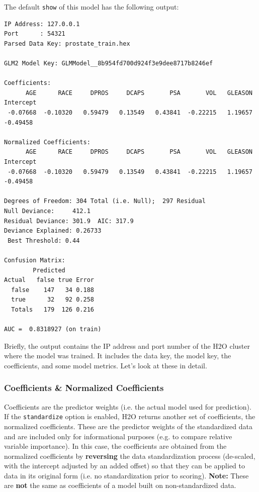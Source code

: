 The default \texttt{show} of this model has the following output:

\begin{lstlisting}[style=output]
IP Address: 127.0.0.1 
Port      : 54321 
Parsed Data Key: prostate_train.hex 

GLM2 Model Key: GLMModel__8b954fd700d924f3e9dee8717b8246ef

Coefficients:
      AGE      RACE     DPROS     DCAPS       PSA       VOL   GLEASON Intercept 
 -0.07668  -0.10320   0.59479   0.13549   0.43841  -0.22215   1.19657  -0.49458 

Normalized Coefficients:
      AGE      RACE     DPROS     DCAPS       PSA       VOL   GLEASON Intercept 
 -0.07668  -0.10320   0.59479   0.13549   0.43841  -0.22215   1.19657  -0.49458 

Degrees of Freedom: 304 Total (i.e. Null);  297 Residual
Null Deviance:     412.1
Residual Deviance: 301.9  AIC: 317.9
Deviance Explained: 0.26733 
 Best Threshold: 0.44

Confusion Matrix:
        Predicted
Actual   false true Error
  false    147   34 0.188
  true      32   92 0.258
  Totals   179  126 0.216

AUC =  0.8318927 (on train) 
\end{lstlisting}

Briefly, the output contains the IP address and port number of the H2O cluster where the model was trained. It
includes the data key, the model key, the coefficients, and some model metrics. Let's look at these in detail.

\subsubsection{Coefficients \& Normalized Coefficients}

Coefficients are the predictor weights (i.e. the actual model used for prediction).  If the \texttt{standardize}
option is enabled, H2O returns another set of coefficients, the normalized coefficients. These are the predictor
weights of the standardized data and are included only for informational purposes (e.g. to compare relative
variable importance). In this case, the coefficients are obtained from the normalized coefficients
by \textbf{reversing} the data standardization process (de-scaled, with the intercept adjusted by an added offset)
so that they can be applied to data in its original form (i.e. no standardization prior to scoring). \textbf{Note:}
These are \textbf{not} the same as coefficients of a model built on non-standardized data.

